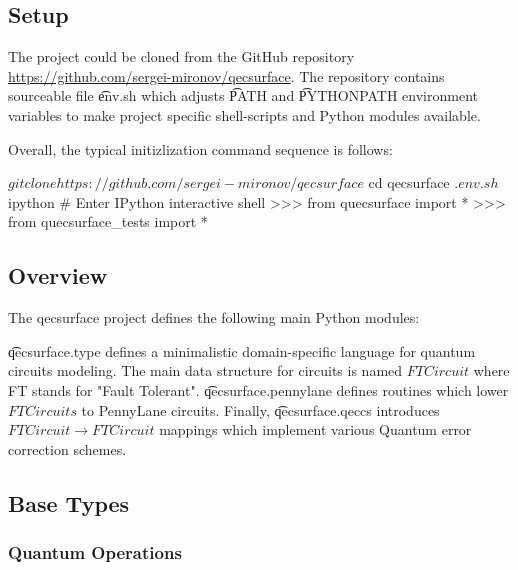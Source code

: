 \subsection{Setup}

The project could be cloned from the GitHub repository
\url{https://github.com/sergei-mironov/qecsurface}. The repository contains sourceable file
\t{env.sh} which adjusts \t{PATH} and \t{PYTHONPATH} environment variables to make project specific
shell-scripts and Python modules available.

Overall, the typical initizlization command sequence is follows:

\begin{sh}
$ git clone https://github.com/sergei-mironov/qecsurface
$ cd qecsurface
$ . env.sh
$ ipython # Enter IPython interactive shell
>>> from quecsurface import *
>>> from quecsurface_tests import *
\end{sh}

\subsection{Overview}

The qecsurface project defines the following main Python modules:

\ls \t{qecsurface.type} defines a minimalistic domain-specific language for quantum circuits
    modeling. The main data structure for circuits is named $FTCircuit$ where FT stands for
    "Fault Tolerant".
\li \t{qecsurface.pennylane} defines routines which lower $FTCircuits$ to PennyLane circuits.
\li Finally, \t{qecsurface.qeccs} introduces $FTCircuit \to FTCircuit$ mappings
    which implement various Quantum error correction schemes.
\le

\subsection{Base Types}

\subsubsection{Quantum Operations}

